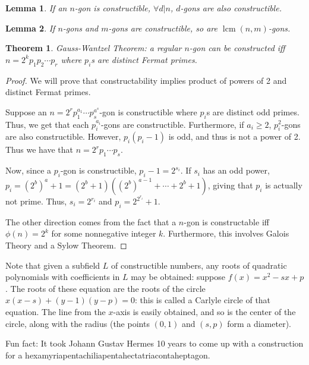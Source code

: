 \documentclass{article}
\theoremstyle{definition}
\theoremstyle{plain}
\newtheorem{theorem}{Theorem}
\theoremstyle{corollary}
\theoremstyle{lemma}
\newtheorem{lemma}{Lemma}
\DeclareMathOperator{\lcm}{lcm}
\begin{document}
\begin{lemma}
    If an $n$-gon is constructible, $\forall d|n$, $d$-gons are also constructible.
\end{lemma}

\begin{lemma}
    If $n$-gons and $m$-gons are constructible, so are $\lcm(n,m)$-gons.
\end{lemma}

\begin{theorem}
    Gauss-Wantzel Theorem: a regular $n$-gon can be constructed iff $n=2^kp_1p_2\cdots p_r$ where $p_i$s are distinct Fermat primes.
\end{theorem}

\begin{proof}
    We will prove that constructability implies product of powers of 2 and distinct Fermat primes.

    Suppose an $n=2^rp_1^{a_1}\cdots p_s^{a^s}$-gon is constructible where $p_i$s are distinct odd primes. Thus, we get that each $p_i^{a_i}$-gons are constructible. Furthermore, if $a_i\geq2$, $p_i^2$-gons are also constructible. However, $p_i(p_i-1)$ is odd, and thus is not a power of 2. Thus we have that $n=2^rp_1\cdots p_s$.

    Now, since a $p_i$-gon is constructible, $p_i-1=2^{s_i}$. If $s_i$ has an odd power, $p_i=(2^b)^a+1=(2^b+1)((2^b)^{a-1}+\cdots+2^b+1)$, giving that $p_i$ is actually not prime. Thus, $s_i=2^{r_i}$ and $p_i=2^{2^{r_i}}+1$.

    The other direction comes from the fact that a $n$-gon is constructable iff $\phi(n)=2^k$ for some nonnegative integer $k$. Furthermore, this involves Galois Theory and a Sylow Theorem.
\end{proof}

Note that given a subfield $L$ of constructible numbers, any roots of quadratic polynomials with coefficients in $L$ may be obtained: suppose $f(x)=x^2-sx+p$. The roots of these equation are the roots of the circle $x(x-s)+(y-1)(y-p)=0$: this is called a Carlyle circle of that equation. The line from the $x$-axis is easily obtained, and so is the center of the circle, along with the radius (the points $(0,1)$ and $(s,p)$ form a diameter). 


Fun fact: It took Johann Gustav Hermes 10 years to come up with a construction for a hexamyriapentachiliapentahectatriacontaheptagon.
\end{document}
